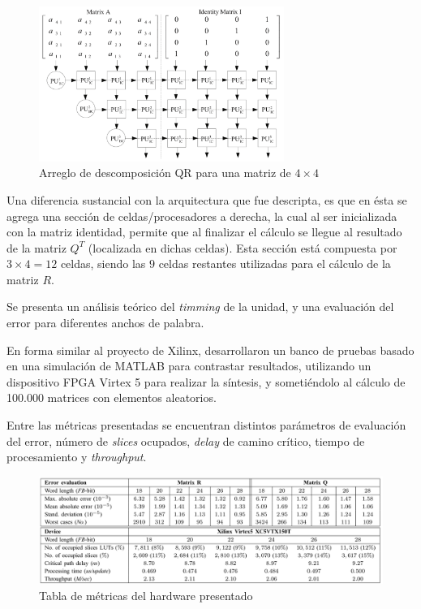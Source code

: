 \begin{figure}[h!]
     \centering
     \includegraphics[width=8cm]{./figures/C03-dongdong_hardware}
     \caption{Arreglo de descomposición QR para una matriz de $4 \times 4$}
     \label{fig:dongdong_hardware}
\end{figure}

Una diferencia sustancial con la arquitectura que fue descripta, es que en ésta se agrega una sección de celdas/procesadores a derecha, la cual al ser inicializada con la matriz identidad, permite que al finalizar el cálculo se llegue al resultado de la matriz $Q^T$ (localizada en dichas celdas). Esta sección está compuesta por $3 \times 4 = 12$ celdas, siendo las $9$ celdas restantes utilizadas para el cálculo de la matriz $R$.

Se presenta un análisis teórico del \textit{timming} de la unidad, y una evaluación del error para diferentes anchos de palabra.

En forma similar al proyecto de Xilinx, desarrollaron un banco de pruebas basado en una simulación de MATLAB para contrastar resultados, utilizando un dispositivo FPGA Virtex 5 para realizar la síntesis, y sometiéndolo al cálculo de 100.000 matrices con elementos aleatorios.

Entre las métricas presentadas se encuentran distintos parámetros de evaluación del error, número de \textit{slices} ocupados, \textit{delay} de camino crítico, tiempo de procesamiento y \textit{throughput}.

\begin{figure}[h!]
     \centering
     \includegraphics[width=14cm]{./figures/C03-dongdong_table}
     \caption{Tabla de métricas del hardware presentado}
     \label{fig:dongdong_table}
\end{figure}


